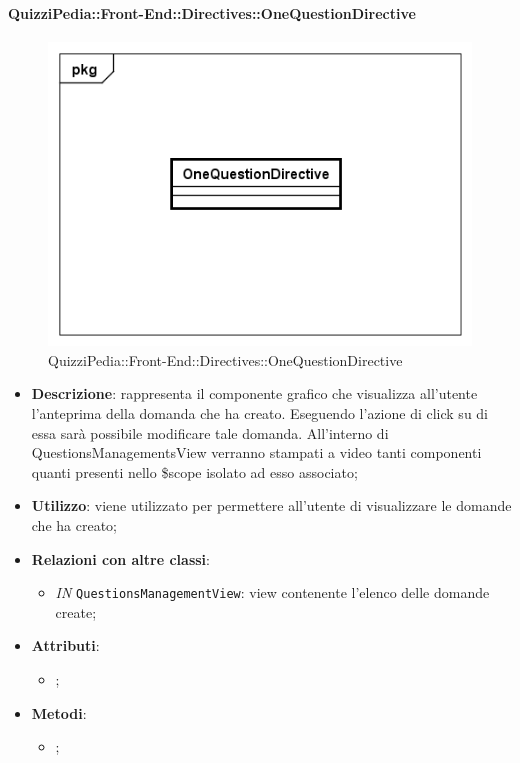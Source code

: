 \paragraph{QuizziPedia::Front-End::Directives::OneQuestionDirective}

\label{QuizziPedia::Front-End::Directives::OneQuestionDirective}

\begin{figure}[ht]
	\centering
	\includegraphics[scale=0.5,keepaspectratio]{UML/Classi/Front-End/QuizziPedia_Front-end_Directives_OneQuestionDirective.png}
	\caption{QuizziPedia::Front-End::Directives::OneQuestionDirective}
\end{figure} \FloatBarrier

\begin{itemize}
	\item \textbf{Descrizione}: rappresenta il componente grafico che visualizza all'utente l'anteprima della domanda che ha creato. Eseguendo l'azione di click su di essa sarà possibile modificare tale domanda. All'interno di QuestionsManagementsView verranno stampati a video tanti componenti quanti presenti nello \$scope isolato ad esso associato;
	\item \textbf{Utilizzo}: viene utilizzato per permettere all'utente di visualizzare le domande che ha creato;
	\item \textbf{Relazioni con altre classi}: 
	\begin{itemize}
		\item \textit{IN} \texttt{QuestionsManagementView}: view contenente l'elenco delle domande create; 
	\end{itemize}
	\item \textbf{Attributi}: 
	\begin{itemize}
		\item ;
	\end{itemize}
	\item \textbf{Metodi}: 
	\begin{itemize}
		\item ;
	\end{itemize}
\end{itemize}

